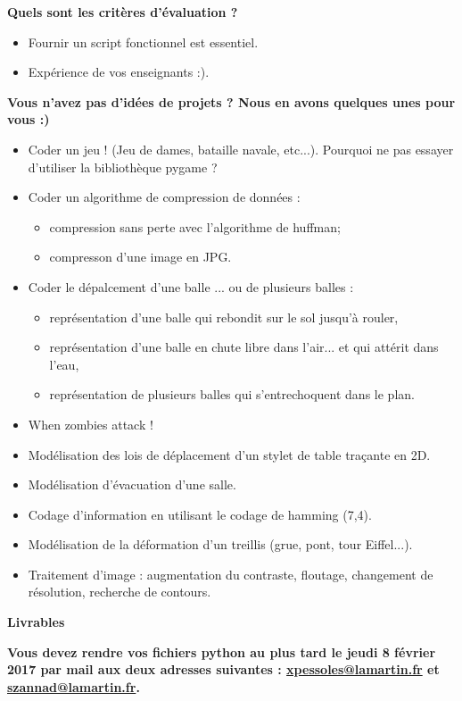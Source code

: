 \documentclass[10pt,fleqn]{article} %
\begin{document}
\vspace{.5cm}
\textbf{Quels sont les critères d'évaluation ?}

\begin{itemize}
\item Fournir un script fonctionnel est essentiel.
\item Expérience de vos enseignants :).
\end{itemize}

\vspace{.5cm}
\textbf{Vous n'avez pas d'idées de projets ? Nous en avons quelques unes pour vous :)}
\begin{itemize}
\item Coder un jeu ! (Jeu de dames, bataille navale, etc...). Pourquoi ne pas essayer d'utiliser la bibliothèque pygame ?
\item Coder un algorithme de compression de données : 
\begin{itemize}
\item compression sans perte avec l'algorithme de huffman;
\item compresson d'une image en JPG.
\end{itemize}
\item Coder le dépalcement d'une balle ... ou de plusieurs balles :
\begin{itemize}
\item représentation d'une balle qui rebondit sur le sol jusqu'à rouler,
\item représentation d'une balle en chute libre dans l'air... et qui attérit dans l'eau,
\item représentation de plusieurs balles qui s'entrechoquent dans le plan.
\end{itemize}
\item When zombies attack !
\item Modélisation des lois de déplacement d'un stylet de table traçante en 2D.
\item Modélisation d'évacuation d'une salle.
\item Codage d'information en utilisant le codage de hamming (7,4).
\item Modélisation de la déformation d'un treillis (grue, pont, tour Eiffel...).
\item Traitement d'image : augmentation du contraste, floutage, changement de résolution,
recherche de contours.
\end{itemize}

\vspace{.5cm}
\textbf{Livrables}

\textbf{Vous devez rendre vos fichiers python au plus tard le jeudi 8 février 2017 par mail aux deux adresses suivantes :
\url{xpessoles@lamartin.fr} et \url{szannad@lamartin.fr}.}





\newpage
\def\columnseprulecolor{\color{ocre}}
\setlength{\columnseprule}{0.4pt} 
\end{document}
